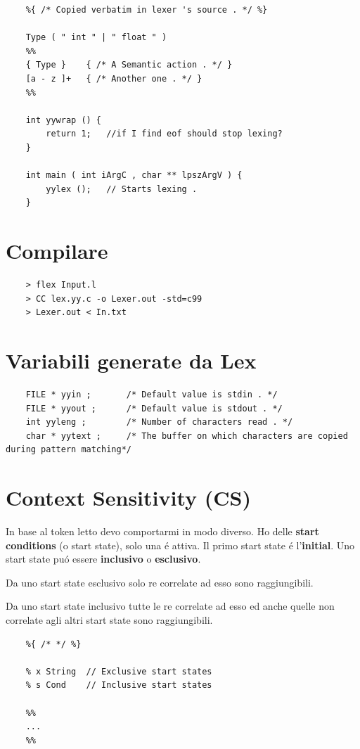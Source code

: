 \begin{lstlisting}
	%{ /* Copied verbatim in lexer 's source . */ %}

	Type ( " int " | " float " )
	%%
	{ Type } 	{ /* A Semantic action . */ }
	[a - z ]+ 	{ /* Another one . */ }
	%%

	int yywrap () { 
		return 1;	//if I find eof should stop lexing?
	}

	int main ( int iArgC , char ** lpszArgV ) {
		yylex (); 	// Starts lexing .
	}
\end{lstlisting}

\section{Compilare}

\begin{lstlisting}
	> flex Input.l
	> CC lex.yy.c -o Lexer.out -std=c99
	> Lexer.out < In.txt
\end{lstlisting}

\section{Variabili generate da Lex}
\begin{lstlisting}
	FILE * yyin ;		/* Default value is stdin . */
	FILE * yyout ;		/* Default value is stdout . */
	int yyleng ;		/* Number of characters read . */
	char * yytext ;		/* The buffer on which characters are copied during pattern matching*/
\end{lstlisting}

\section{Context Sensitivity (CS)}
In base al token letto devo comportarmi in modo diverso.
Ho delle \textbf{start conditions} (o start state), solo una \'e attiva. Il primo start state \'e l'\textbf{initial}.
Uno start state pu\'o essere \textbf{inclusivo} o \textbf{esclusivo}.

Da uno start state esclusivo solo re correlate ad esso sono raggiungibili.

Da uno start state inclusivo tutte le re correlate ad esso ed anche quelle non correlate agli altri start state sono raggiungibili.

\begin{lstlisting}
	%{ /* */ %}

	% x String 	// Exclusive start states
	% s Cond 	// Inclusive start states

	%%
	...
	%%
\end{lstlisting}

